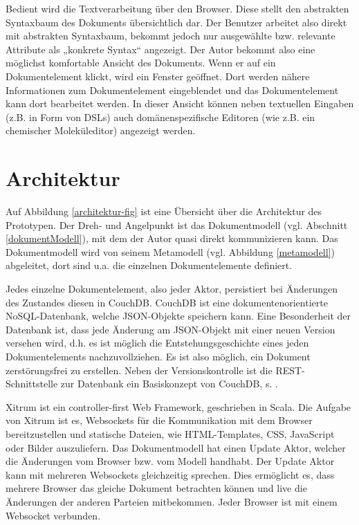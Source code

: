  
Bedient wird die Textverarbeitung über den Browser. Diese stellt den abstrakten Syntaxbaum des Dokuments übersichtlich dar. Der Benutzer arbeitet also direkt mit abstrakten Syntaxbaum, bekommt jedoch nur ausgewählte bzw. relevante Attribute als „konkrete Syntax“ angezeigt. Der Autor bekommt also eine möglichst komfortable Ansicht des Dokuments. Wenn er auf ein Dokumentelement klickt, wird ein Fenster geöffnet. Dort werden nähere Informationen zum Dokumentelement eingeblendet und das Dokumentelement kann dort bearbeitet werden. In dieser Ansicht können neben textuellen Eingaben (z.B. in Form von DSLs) auch domänenspezifische Editoren (wie z.B. ein chemischer Moleküleditor) angezeigt werden.

 
\section{Architektur}\label{}
 
Auf Abbildung \ref{architektur-fig} ist eine Übersicht über die Architektur des Prototypen. Der Dreh- und Angelpunkt ist das Dokumentmodell (vgl. Abschnitt \ref{dokumentModell}), mit dem der Autor quasi direkt kommunizieren kann. Das Dokumentmodell wird von seinem Metamodell (vgl. Abbildung \ref{metamodell}) abgeleitet, dort sind u.a. die einzelnen Dokumentelemente definiert.

 
Jedes einzelne Dokumentelement, also jeder Aktor, persistiert bei Änderungen des Zustandes diesen in CouchDB. CouchDB ist eine dokumentenorientierte NoSQL-Datenbank, welche JSON-Objekte speichern kann. Eine Besonderheit der Datenbank ist, dass jede Änderung am JSON-Objekt mit einer neuen Version versehen wird, d.h. es ist möglich die Entstehungsgeschichte eines jeden Dokumentelements nachzuvollziehen. Es ist also möglich, ein Dokument zerstörungsfrei zu erstellen. Neben der Versionskontrolle ist die REST-Schnittstelle zur Datenbank ein Basiskonzept von CouchDB, s. \citep{Anderson}.

 
Xitrum ist ein controller-first Web Framework, geschrieben in Scala. Die Aufgabe von Xitrum ist es, Websockets für die Kommunikation mit dem Browser bereitzustellen und statische Dateien, wie HTML-Templates, CSS, JavaScript oder Bilder auszuliefern. Das Dokumentmodell hat einen Update Aktor, welcher die Änderungen vom Browser bzw. vom Modell handhabt. Der Update Aktor kann mit mehreren Websockets gleichzeitig sprechen. Dies ermöglicht es, dass mehrere Browser das gleiche Dokument betrachten können und live die Änderungen der anderen Parteien mitbekommen. Jeder Browser ist mit einem Websocket verbunden.

